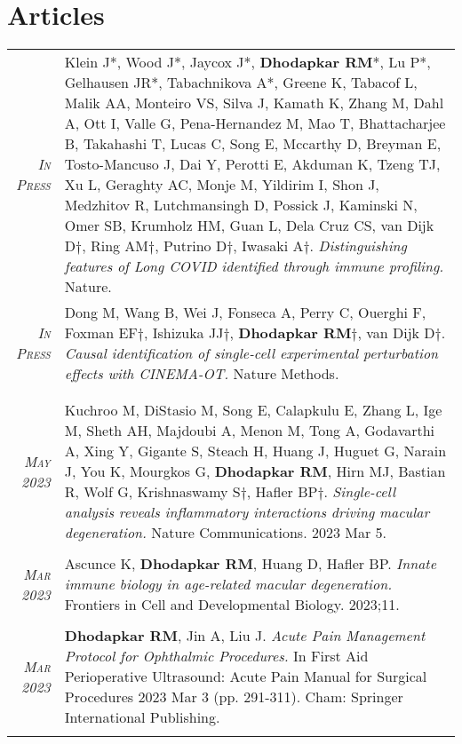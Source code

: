\documentclass[a4paper,10pt]{article}
\begin{document}
\section{Articles}
\begin{longtable}{rp{11cm}}
\textit{\textsc{In Press}}& Klein J*, Wood J*, Jaycox J*, {\bf Dhodapkar RM}*, Lu P*, Gelhausen JR*, Tabachnikova A*, Greene K, Tabacof L, Malik AA, Monteiro VS, Silva J, Kamath K, Zhang M, Dahl A, Ott I, Valle G, Pena-Hernandez M, Mao T, Bhattacharjee B, Takahashi T, Lucas C, Song E, Mccarthy D, Breyman E, Tosto-Mancuso J, Dai Y, Perotti E, Akduman K, Tzeng TJ, Xu L, Geraghty AC, Monje M, Yildirim I, Shon J, Medzhitov R, Lutchmansingh D, Possick J, Kaminski N, Omer SB, Krumholz HM, Guan L, Dela Cruz CS, van Dijk D$\dag$, Ring AM$\dag$, Putrino D$\dag$, Iwasaki A$\dag$. {\it Distinguishing features of Long COVID identified through immune profiling.} Nature. \\
\textit{\textsc{In Press}}& Dong M, Wang B, Wei J, Fonseca A, Perry C, Ouerghi F, Foxman EF$\dag$, Ishizuka JJ$\dag$, {\bf Dhodapkar RM}$\dag$, van Dijk D$\dag$. {\it Causal identification of single-cell experimental perturbation effects with CINEMA-OT.} Nature Methods. \\
\multicolumn{2}{c}{} \\
\multicolumn{2}{c}{} \\
 \textit{\textsc{May} 2023}& Kuchroo M, DiStasio M, Song E, Calapkulu E, Zhang L, Ige M, Sheth AH, Majdoubi A, Menon M, Tong A, Godavarthi A, Xing Y, Gigante S, Steach H, Huang J, Huguet G, Narain J, You K, Mourgkos G, {\bf Dhodapkar RM}, Hirn MJ, Bastian R, Wolf G, Krishnaswamy S$\dag$, Hafler BP$\dag$. {\it Single-cell analysis reveals inflammatory interactions driving macular degeneration.} Nature Communications. 2023 Mar 5. \\
\multicolumn{2}{c}{} \\
 \textit{\textsc{Mar} 2023}& Ascunce K, {\bf Dhodapkar RM}, Huang D, Hafler BP. {\it Innate immune biology in age-related macular degeneration.} Frontiers in Cell and Developmental Biology. 2023;11.
 \\
\multicolumn{2}{c}{} \\
 \textit{\textsc{Mar} 2023}& {\bf Dhodapkar RM}, Jin A, Liu J. {\it Acute Pain Management Protocol for Ophthalmic Procedures.} In First Aid Perioperative Ultrasound: Acute Pain Manual for Surgical Procedures 2023 Mar 3 (pp. 291-311). Cham: Springer International Publishing.
 \\
\multicolumn{2}{c}{} \\

\end{longtable}
\end{document}
